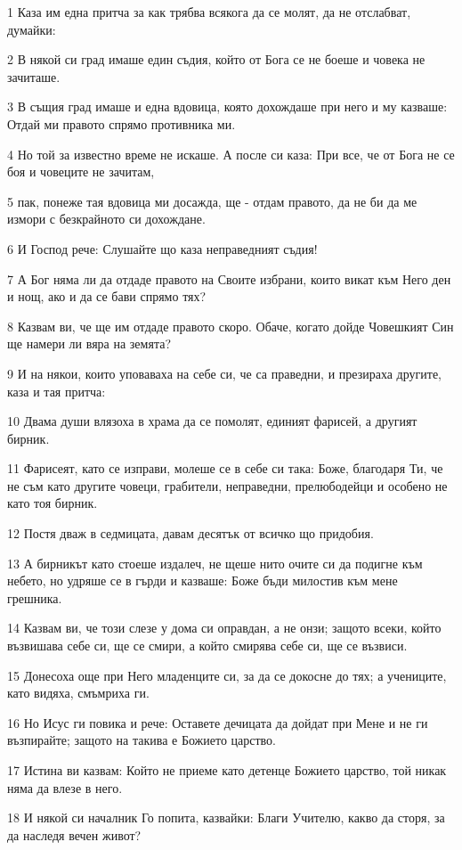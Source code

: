 \par 1 Каза им една притча за как трябва всякога да се молят, да не отслабват, думайки:
\par 2 В някой си град имаше един съдия, който от Бога се не боеше и човека не зачиташе.
\par 3 В същия град имаше и една вдовица, която дохождаше при него и му казваше: Отдай ми правото спрямо противника ми.
\par 4 Но той за известно време не искаше. А после си каза: При все, че от Бога не се боя и човеците не зачитам,
\par 5 пак, понеже тая вдовица ми досажда, ще - отдам правото, да не би да ме измори с безкрайното си дохождане.
\par 6 И Господ рече: Слушайте що каза неправедният съдия!
\par 7 А Бог няма ли да отдаде правото на Своите избрани, които викат към Него ден и нощ, ако и да се бави спрямо тях?
\par 8 Казвам ви, че ще им отдаде правото скоро. Обаче, когато дойде Човешкият Син ще намери ли вяра на земята?
\par 9 И на някои, които уповаваха на себе си, че са праведни, и презираха другите, каза и тая притча:
\par 10 Двама души влязоха в храма да се помолят, единият фарисей, а другият бирник.
\par 11 Фарисеят, като се изправи, молеше се в себе си така: Боже, благодаря Ти, че не съм като другите човеци, грабители, неправедни, прелюбодейци и особено не като тоя бирник.
\par 12 Постя дваж в седмицата, давам десятък от всичко що придобия.
\par 13 А бирникът като стоеше издалеч, не щеше нито очите си да подигне към небето, но удряше се в гърди и казваше: Боже бъди милостив към мене грешника.
\par 14 Казвам ви, че този слезе у дома си оправдан, а не онзи; защото всеки, който възвишава себе си, ще се смири, а който смирява себе си, ще се възвиси.
\par 15 Донесоха още при Него младенците си, за да се докосне до тях; а учениците, като видяха, смъмриха ги.
\par 16 Но Исус ги повика и рече: Оставете дечицата да дойдат при Мене и не ги възпирайте; защото на такива е Божието царство.
\par 17 Истина ви казвам: Който не приеме като детенце Божието царство, той никак няма да влезе в него.
\par 18 И някой си началник Го попита, казвайки: Благи Учителю, какво да сторя, за да наследя вечен живот?
